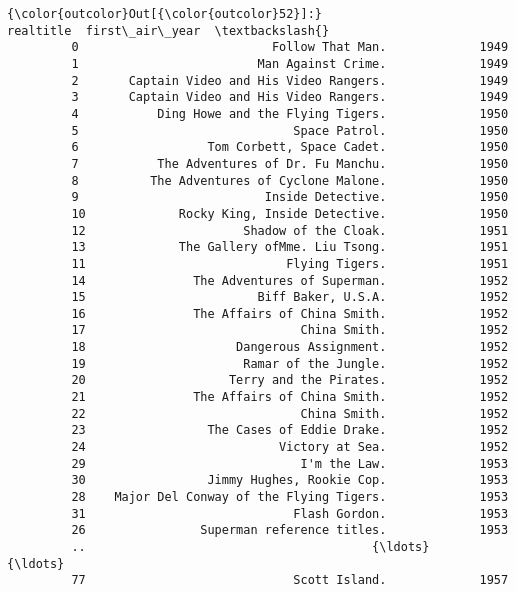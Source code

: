 \documentclass[11pt]{article}
\begin{document}
\begin{Verbatim}[commandchars=\\\{\}]
{\color{outcolor}Out[{\color{outcolor}52}]:}                                     realtitle  first\_air\_year  \textbackslash{}
         0                           Follow That Man.             1949   
         1                         Man Against Crime.             1949   
         2       Captain Video and His Video Rangers.             1949   
         3       Captain Video and His Video Rangers.             1949   
         4           Ding Howe and the Flying Tigers.             1950   
         5                              Space Patrol.             1950   
         6                  Tom Corbett, Space Cadet.             1950   
         7           The Adventures of Dr. Fu Manchu.             1950   
         8          The Adventures of Cyclone Malone.             1950   
         9                          Inside Detective.             1950   
         10             Rocky King, Inside Detective.             1950   
         12                      Shadow of the Cloak.             1951   
         13             The Gallery ofMme. Liu Tsong.             1951   
         11                            Flying Tigers.             1951   
         14               The Adventures of Superman.             1952   
         15                        Biff Baker, U.S.A.             1952   
         16               The Affairs of China Smith.             1952   
         17                              China Smith.             1952   
         18                     Dangerous Assignment.             1952   
         19                      Ramar of the Jungle.             1952   
         20                    Terry and the Pirates.             1952   
         21               The Affairs of China Smith.             1952   
         22                              China Smith.             1952   
         23                 The Cases of Eddie Drake.             1952   
         24                           Victory at Sea.             1952   
         29                              I'm the Law.             1953   
         30                 Jimmy Hughes, Rookie Cop.             1953   
         28    Major Del Conway of the Flying Tigers.             1953   
         31                             Flash Gordon.             1953   
         26                Superman reference titles.             1953   
         ..                                        {\ldots}             {\ldots}   
         77                             Scott Island.             1957   

\end{Verbatim}
\end{document}
